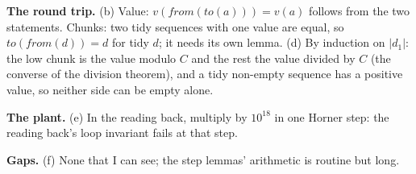 \documentclass[11pt]{article}
\begin{document}
\begin{answer}
\textbf{The round trip.}
(b) Value: $v(\mathit{from}(\mathit{to}(a))) = v(a)$ follows from the two
statements. Chunks: two tidy sequences with one value are equal, so
$\mathit{to}(\mathit{from}(d)) = d$ for tidy $d$; it needs its own lemma.
(d) By induction on $|d_1|$: the low chunk is the value modulo $C$ and the
rest the value divided by $C$ (the converse of the division theorem), and a
tidy non-empty sequence has a positive value, so neither side can be empty
alone.

\textbf{The plant.}
(e) In the reading back, multiply by $10^{18}$ in one Horner step: the
reading back's loop invariant fails at that step.

\textbf{Gaps.}
(f) None that I can see; the step lemmas' arithmetic is routine but long.
\end{answer}

\end{document}
